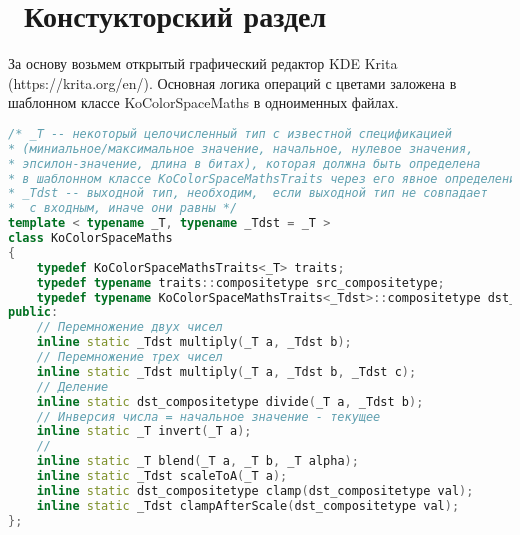 \chapter{ Констукторский раздел}
\label{cha:design}

За основу возьмем открытый графический редактор KDE Krita (https://krita.org/en/). Основная логика операций с цветами заложена в шаблонном классе KoColorSpaceMaths в одноименных файлах. 

\begin{lstlisting}[language=c++]
/* _T -- некоторый целочисленный тип c известной спецификацией 
* (миниальное/максимальное значение, начальное, нулевое значения, 
* эпсилон-значение, длина в битах), которая должна быть определена 
* в шаблонном классе KoColorSpaceMathsTraits через его явное определение.  
* _Tdst -- выходной тип, необходим,  если выходной тип не совпадает
*  с входным, иначе они равны */
template < typename _T, typename _Tdst = _T >
class KoColorSpaceMaths
{
    typedef KoColorSpaceMathsTraits<_T> traits;
    typedef typename traits::compositetype src_compositetype;
    typedef typename KoColorSpaceMathsTraits<_Tdst>::compositetype dst_compositetype;
public:
	// Перемножение двух чисел
    inline static _Tdst multiply(_T a, _Tdst b);
    // Перемножение трех чисел
    inline static _Tdst multiply(_T a, _Tdst b, _Tdst c);
    // Деление
    inline static dst_compositetype divide(_T a, _Tdst b);
    // Инверсия числа = начальное значение - текущее
    inline static _T invert(_T a);
    // 
    inline static _T blend(_T a, _T b, _T alpha);
    inline static _Tdst scaleToA(_T a);
    inline static dst_compositetype clamp(dst_compositetype val);
    inline static _Tdst clampAfterScale(dst_compositetype val);
};
\end{lstlisting}


